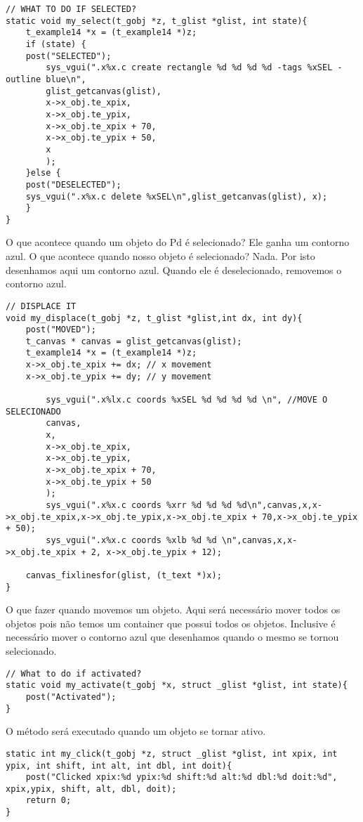 \begin{lstlisting}
// WHAT TO DO IF SELECTED?
static void my_select(t_gobj *z, t_glist *glist, int state){
 	t_example14 *x = (t_example14 *)z;
 	if (state) {
	post("SELECTED");
        sys_vgui(".x%x.c create rectangle %d %d %d %d -tags %xSEL -outline blue\n",
		glist_getcanvas(glist),
		x->x_obj.te_xpix,
		x->x_obj.te_ypix,
		x->x_obj.te_xpix + 70,
		x->x_obj.te_ypix + 50,
		x
		);
	}else {
	post("DESELECTED");
 	sys_vgui(".x%x.c delete %xSEL\n",glist_getcanvas(glist), x);
	}
}
\end{lstlisting}

O que acontece quando um objeto do Pd é selecionado? Ele ganha um contorno azul. O que acontece
quando nosso objeto é selecionado? Nada. Por isto desenhamos aqui um contorno azul. Quando ele
é deselecionado, removemos o contorno azul.

\begin{lstlisting}
// DISPLACE IT
void my_displace(t_gobj *z, t_glist *glist,int dx, int dy){
	post("MOVED");
	t_canvas * canvas = glist_getcanvas(glist);
	t_example14 *x = (t_example14 *)z;
	x->x_obj.te_xpix += dx; // x movement
	x->x_obj.te_ypix += dy; // y movement

        sys_vgui(".x%lx.c coords %xSEL %d %d %d %d \n", //MOVE O SELECIONADO
		canvas,
		x,
		x->x_obj.te_xpix,
		x->x_obj.te_ypix,
		x->x_obj.te_xpix + 70,
		x->x_obj.te_ypix + 50
		);
        sys_vgui(".x%x.c coords %xrr %d %d %d %d\n",canvas,x,x->x_obj.te_xpix,x->x_obj.te_ypix,x->x_obj.te_xpix + 70,x->x_obj.te_ypix + 50);
        sys_vgui(".x%x.c coords %xlb %d %d \n",canvas,x,x->x_obj.te_xpix + 2, x->x_obj.te_ypix + 12);

	canvas_fixlinesfor(glist, (t_text *)x);
}
\end{lstlisting}

O que fazer quando movemos um objeto. Aqui será necessário mover todos os objetos pois não temos um
container que possui todos os objetos. Inclusive é necessário mover o contorno azul que desenhamos
quando o mesmo se tornou selecionado.

\begin{lstlisting}
// What to do if activated?
static void my_activate(t_gobj *x, struct _glist *glist, int state){
	post("Activated");
}
\end{lstlisting}

O método será executado quando um objeto se tornar ativo.

\begin{lstlisting}
static int my_click(t_gobj *z, struct _glist *glist, int xpix, int ypix, int shift, int alt, int dbl, int doit){
	post("Clicked xpix:%d ypix:%d shift:%d alt:%d dbl:%d doit:%d", xpix,ypix, shift, alt, dbl, doit);
	return 0;
}
\end{lstlisting}

